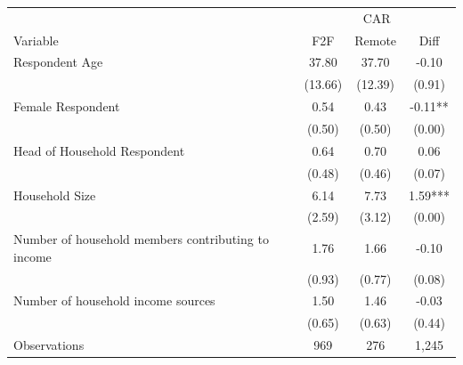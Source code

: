 \begin{tabular}{l*{3}c}
\hline\hline
 & \multicolumn{3}{c}{CAR}\\ 
Variable & F2F & Remote & Diff \\
\hline
Respondent Age&37.80&37.70&-0.10\\
&(13.66)&(12.39)&(0.91)\\
Female Respondent&0.54&0.43&-0.11**\\
&(0.50)&(0.50)&(0.00)\\
Head of Household Respondent&0.64&0.70&0.06\\
&(0.48)&(0.46)&(0.07)\\
Household Size&6.14&7.73&1.59***\\
&(2.59)&(3.12)&(0.00)\\
Number of household members contributing to income&1.76&1.66&-0.10\\
&(0.93)&(0.77)&(0.08)\\
Number of household income sources&1.50&1.46&-0.03\\
&(0.65)&(0.63)&(0.44)\\
\hline
Observations & 969 & 276 & 1,245 \\
\hline\hline
\end{tabular}
